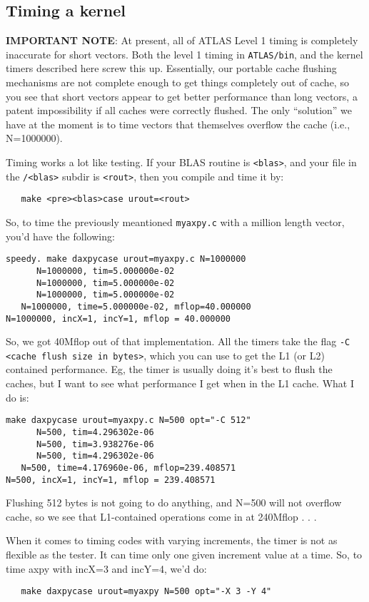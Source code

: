 \documentclass[11pt]{article}
\begin{document}
\subsection{Timing a kernel}
{\bf IMPORTANT NOTE}: At present, all of ATLAS Level 1 timing is
completely inaccurate for short vectors.  Both the level 1 timing
in {\tt ATLAS/bin}, and the kernel timers described here screw this
up.  Essentially, our portable cache flushing mechanisms are not complete enough
to get things completely out of cache, so you see that short vectors appear
to get better performance than long vectors, a patent impossibility if all
caches were correctly flushed.  The only ``solution'' we have at the moment
is to time vectors that themselves overflow the cache (i.e., N=1000000).

Timing works a lot like testing.  If your BLAS routine is {\tt <blas>},
and your file in the {\tt /<blas>} subdir is {\tt <rout>},
then you compile and time it by:
\begin{verbatim}
   make <pre><blas>case urout=<rout>
\end{verbatim}

So, to time the previously meantioned {\tt myaxpy.c} with a million
length vector, you'd have the following:
\begin{verbatim}
speedy. make daxpycase urout=myaxpy.c N=1000000
      N=1000000, tim=5.000000e-02
      N=1000000, tim=5.000000e-02
      N=1000000, tim=5.000000e-02
   N=1000000, time=5.000000e-02, mflop=40.000000
N=1000000, incX=1, incY=1, mflop = 40.000000
\end{verbatim}

So, we got 40Mflop out of that implementation.
All the timers take the flag {\tt -C <cache flush size in bytes>}, which
you can use to get the L1 (or L2) contained performance.  Eg, the timer
is usually doing it's best to flush the caches, but I want to see what
performance I get when in the L1 cache.  What I do is:
\begin{verbatim}
make daxpycase urout=myaxpy.c N=500 opt="-C 512"
      N=500, tim=4.296302e-06
      N=500, tim=3.938276e-06
      N=500, tim=4.296302e-06
   N=500, time=4.176960e-06, mflop=239.408571
N=500, incX=1, incY=1, mflop = 239.408571
\end{verbatim}
Flushing 512 bytes is not going to do anything, and N=500 will not overflow
cache, so we see that L1-contained operations come in at 240Mflop . . .

When it comes to timing codes with varying increments, the timer is not as
flexible as the tester.  It can time only one given increment value at a
time.  So, to time axpy with incX=3 and incY=4, we'd do:
\begin{verbatim}
   make daxpycase urout=myaxpy N=500 opt="-X 3 -Y 4"
\end{verbatim}
\end{document}
